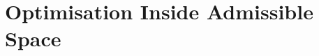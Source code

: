 \documentclass[../../../clio.tex]{subfiles}
\begin{document}
\chapter{Optimisation Inside Admissible Space}
\label{ch:chapter-06-optimization-admissible-space}





















\end{document}
